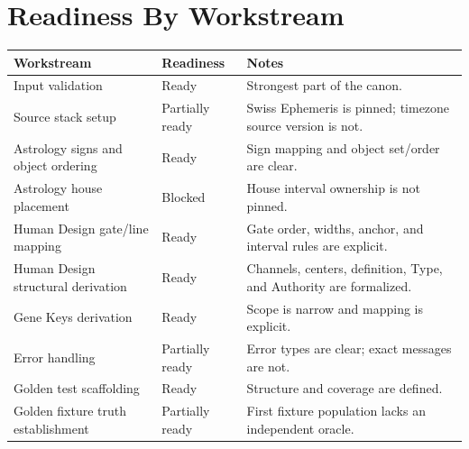 \documentclass[11pt]{article}
\begin{document}
\section{Readiness By Workstream}
\label{sec:org4a314fb}
\begin{center}
\begin{tabular}{lll}
Workstream & Readiness & Notes\\
\hline
Input validation & Ready & Strongest part of the canon.\\
Source stack setup & Partially ready & Swiss Ephemeris is pinned; timezone source version is not.\\
Astrology signs and object ordering & Ready & Sign mapping and object set/order are clear.\\
Astrology house placement & Blocked & House interval ownership is not pinned.\\
Human Design gate/line mapping & Ready & Gate order, widths, anchor, and interval rules are explicit.\\
Human Design structural derivation & Ready & Channels, centers, definition, Type, and Authority are formalized.\\
Gene Keys derivation & Ready & Scope is narrow and mapping is explicit.\\
Error handling & Partially ready & Error types are clear; exact messages are not.\\
Golden test scaffolding & Ready & Structure and coverage are defined.\\
Golden fixture truth establishment & Partially ready & First fixture population lacks an independent oracle.\\
\end{tabular}
\end{center}
\end{document}
